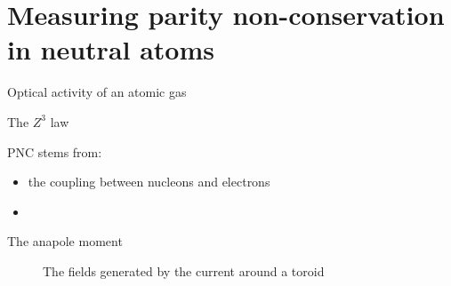 \documentclass[10pt]{beamer}
\begin{document}
\section{Measuring parity non-conservation in neutral atoms}

\begin{frame}{Optical activity of an atomic gas}


\end{frame}

\begin{frame}{The $Z^3$ law}

	PNC stems from:
	\begin{itemize}

		\item<1-> the coupling between nucleons and electrons\only<4->{ $\propto Z^3$}
		\item<2->

	\end{itemize}

\end{frame}

\begin{frame}{The anapole moment}

	\begin{figure}[h!]
		\centering
		\caption{The fields generated by the current around a toroid}
		\label{fig:AnapoleMoment}
	\end{figure}


\end{frame}
\end{document}
